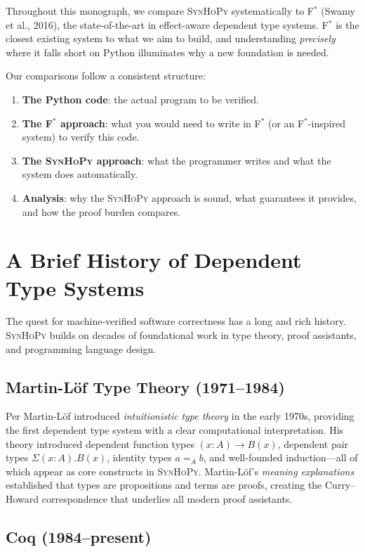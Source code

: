 \documentclass[11pt,a4paper]{report}
\theoremstyle{definition}
\theoremstyle{plain}
\newcommand{\fstar}{F$^{*}$}
\newcommand{\synhopy}{\textsc{SynHoPy}}
\begin{document}
Throughout this monograph, we compare \synhopy{} systematically to \fstar{}
(Swamy et al., 2016), the state-of-the-art in effect-aware dependent type systems.
\fstar{} is the closest existing system to what we aim to build, and understanding
\emph{precisely} where it falls short on Python illuminates why a new
foundation is needed.

Our comparisons follow a consistent structure:

\begin{enumerate}
  \item \textbf{The Python code}: the actual program to be verified.
  \item \textbf{The \fstar{} approach}: what you would need to write in \fstar{}
    (or an \fstar{}-inspired system) to verify this code.
  \item \textbf{The \synhopy{} approach}: what the programmer writes and what the
    system does automatically.
  \item \textbf{Analysis}: why the \synhopy{} approach is sound, what guarantees
    it provides, and how the proof burden compares.
\end{enumerate}

\section{A Brief History of Dependent Type Systems}

The quest for machine-verified software correctness has a long and rich history.
\synhopy{} builds on decades of foundational work in type theory, proof assistants,
and programming language design.

\subsection{Martin-L\"of Type Theory (1971--1984)}

Per Martin-L\"of introduced \emph{intuitionistic type theory} in the early
1970s, providing the first dependent type system with a clear computational
interpretation.  His theory introduced dependent function types $(x : A) \to B(x)$,
dependent pair types $\Sigma(x : A). B(x)$, identity types $a =_A b$, and
well-founded induction---all of which appear as core constructs in \synhopy{}.
Martin-L\"of's \emph{meaning explanations} established that types are
propositions and terms are proofs, creating the Curry--Howard correspondence
that underlies all modern proof assistants.

\subsection{Coq (1984--present)}
\end{document}
